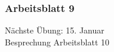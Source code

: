 \documentclass[9pt,german]{beamer}%
\begin{document}
\maketitle%
\addtocounter{framenumber}{-1}%

\begin{frame}
  \frametitle{Arbeitsblatt 9}%
\tableofcontents
\end{frame}


\setcounter{exercise}{33}


\setcounter{exercise}{34}



\begin{frame}
\centering
\Huge{}
\vspace{2cm}

{\LARGE
N\"achste \"Ubung: 15. Januar\\
Besprechung Arbeitsblatt 10
}
\end{frame}


\end{document}
